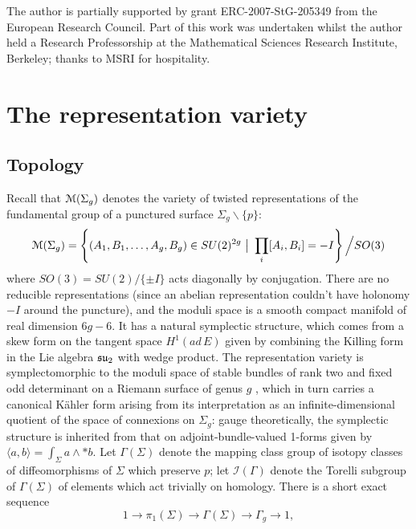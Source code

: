 \documentclass[reqno,10pt]{amsart}
\numberwithin{equation}{section}
\newcommand{\scrM}{\EuScript{M}}
\newcommand{\cI}{{\mathcal I}}
\theoremstyle{remark}
\begin{document}
\noindent The author is partially supported by grant ERC-2007-StG-205349 from the European Research Council. Part of this work was undertaken whilst the author held a Research Professorship at the Mathematical Sciences Research Institute, Berkeley; thanks to MSRI for hospitality.

\section{The representation variety}\label{Sec:Top}

\subsection{Topology\label{Sec:Topology}}
Recall that $\scrM(\Sigma_g)$ denotes the variety of twisted representations of the fundamental group of a punctured surface $\Sigma_g\backslash \{p\}$:
\begin{equation}\label{Eqn:RepVar}
\scrM(\Sigma_g) =  \left\{ (A_1,B_1,\ldots, A_g,B_g) \in SU(2)^{2g} \ \big| \ \prod_i [A_i,B_i] = -I \right\} \Big/ SO(3)
\end{equation}
where $SO(3) = SU(2)/\{\pm I\}$ acts diagonally by conjugation.   There are no reducible representations (since an abelian representation couldn't have holonomy $-I$ around the puncture), and the moduli space is a smooth compact manifold of real dimension $6g-6$.   It has a natural symplectic structure, which comes from a skew form on the tangent space $H^1(ad \,E)$ given by combining the Killing form in the Lie algebra $\frak{su}_2$ with wedge product.  The representation variety is symplectomorphic to the moduli space of stable bundles of rank two and fixed odd determinant on a Riemann surface of genus $g$ \cite{NS}, which in turn carries a canonical K\"ahler form arising from its interpretation as an infinite-dimensional quotient of the space of connexions on $\Sigma_g$:  gauge theoretically,  the symplectic structure is inherited from that on adjoint-bundle-valued 1-forms given by $\langle a,b \rangle = \int_{\Sigma} a\wedge \ast b$.  
Let $\Gamma(\Sigma)$ denote the mapping class group of isotopy classes of diffeomorphisms of $\Sigma$ which preserve  $p$; let $\cI(\Gamma)$ denote the Torelli subgroup of $\Gamma(\Sigma)$ of elements which act trivially on homology.   There is a short exact sequence 
\begin{equation} \label{Eqn:ExSeqNotSplit}
1 \rightarrow \pi_1(\Sigma) \rightarrow \Gamma(\Sigma) \rightarrow \Gamma_g \rightarrow 1,
\end{equation}
\end{document}
